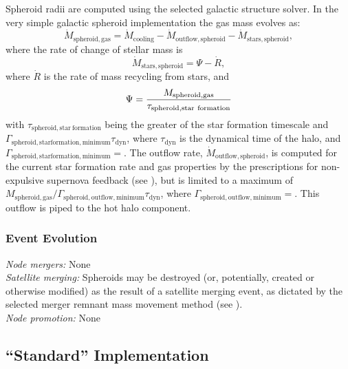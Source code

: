 Spheroid radii are computed using the selected galactic structure solver. In the very simple galactic spheroid implementation the gas mass evolves as:
\begin{equation}
 \dot{M}_\mathrm{spheroid, gas} = \dot{M}_\mathrm{cooling} - \dot{M}_\mathrm{outflow, spheroid} - \dot{M}_\mathrm{stars, spheroid},
\end{equation}
where the rate of change of stellar mass is
\begin{equation}
 \dot{M}_\mathrm{stars, spheroid} = \Psi - \dot{R},
\end{equation}
where $\dot{R}$ is the rate of mass recycling from stars, and
\begin{equation}
 \Psi = {M_\mathrm{spheroid, gas} \over \tau_\mathrm{spheroid, star~formation}}
\end{equation}
with $\tau_\mathrm{spheroid, star~formation}$ being the greater of the star formation timescale and $\Gamma_\mathrm{spheroid, star formation, minimum} \tau_\mathrm{dyn}$, where $\tau_\mathrm{dyn}$ is the dynamical time of the halo, and $\Gamma_\mathrm{spheroid, star formation, minimum}=$\mono{[spheroidStarFormationTimescaleMinimum]}. The outflow rate, $\dot{M}_\mathrm{outflow, spheroid}$, is computed for the current star formation rate and gas properties by the prescriptions for non-expulsive supernova feedback (see ), but is limited to a maximum of $M_\mathrm{spheroid, gas}/ \Gamma_\mathrm{spheroid, outflow, minimum} \tau_\mathrm{dyn}$, where $\Gamma_\mathrm{spheroid, outflow, minimum}=$\mono{[spheroidOutflowTimescaleMinimum]}. This outflow is piped to the hot halo component.

\subsubsection{Event Evolution}

\noindent\emph{Node mergers:} None\\

\noindent\emph{Satellite merging:} Spheroids may be destroyed (or, potentially, created or otherwise modified) as the result of a satellite merging event, as dictated by the selected merger remnant mass movement method (see ).\\

\noindent\emph{Node promotion:} None\\

\subsection{``Standard'' Implementation}

